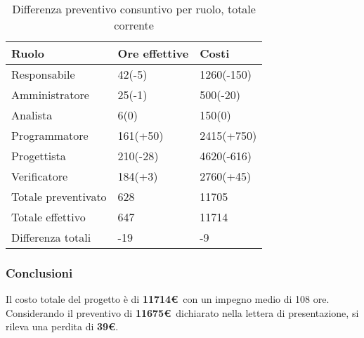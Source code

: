 		
	\begin{table}[H]
		\centering
	  \begin{tabular}{p{}p{}
		    							p{}}
		   \toprule Ruolo & Ore effettive & Costi \\
		   \midrule
			  Responsabile & 42(-5)  & 1260(-150) \\
			  Amministratore & 25(-1) & 500(-20) \\
			  Analista & 6(0) & 150(0) \\
			  Programmatore & 161(+50)  & 2415(+750) \\
			  Progettista & 210(-28)  & 4620(-616) \\
			  Verificatore & 184(+3)  & 2760(+45) \\
			  \hline
			  Totale preventivato & 628  & 11705 \\
			
			  Totale effettivo & 647  & 11714 \\
		
			  Differenza totali & -19  & -9 \\
			  \bottomrule
			 \end{tabular}
			 \label{tab:diffcostorendicontato}
			 \caption{Differenza preventivo consuntivo per ruolo, totale corrente}
			\end{table}
			
\subsubsection{Conclusioni}
Il costo totale del progetto è di \textbf{11714\euro}\ con un impegno medio di 108 ore. Considerando il preventivo di \textbf{11675\euro}\ dichiarato nella lettera di presentazione, si rileva una perdita di \textbf{39\euro}.		
